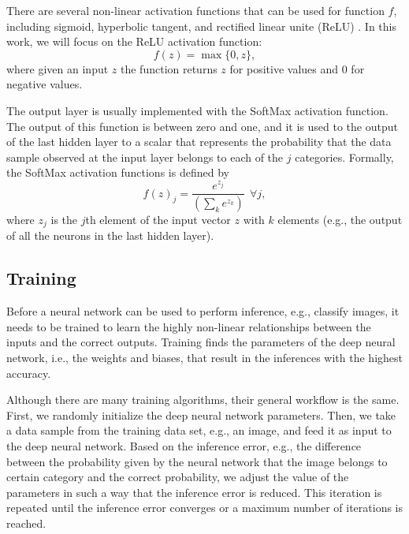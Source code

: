 \documentclass[conference]{IEEEtran}
\begin{document}
There are several non-linear activation functions that can be used for function $f$, including sigmoid,
hyperbolic tangent, and rectified linear unite (ReLU) \cite{Goodfellow-et-al-2016}. In this
work, we will focus on the ReLU activation function:
$$f(z) = \max\{0, z\},$$
where given an input $z$ the function returns $z$ for positive values and $0$ for negative values.

The output layer is usually implemented with the SoftMax activation function. The output of this function is between zero and
one, and it is used to the output of the last hidden layer to a scalar that represents the probability that the data sample observed at
the input layer belongs to each of the $j$ categories. Formally, the SoftMax activation functions is defined by
$$f(z)_j = \frac{e^{z_j}} {(\sum_ke^{z_k})} \ \  \forall j,$$
where $z_j$ is the $j$th element of the input vector $z$ with $k$ elements (e.g., the output of all the neurons in the last hidden
layer).

\subsection{Training}
Before a neural network can be used to perform inference, e.g., classify images, it needs to be trained to learn the highly non-linear relationships between the inputs and the correct outputs. Training finds the
parameters of the deep neural network, i.e., the weights and biases, that result in the inferences with the highest accuracy.  

Although there are many training algorithms, their general workflow is the same. 
First, we randomly initialize the deep neural network parameters.
Then, we take a data sample from the training data set, e.g., an image, and feed it as input to the deep neural network. Based on the
inference error, e.g., the difference between the probability given by the neural network that the image belongs to certain category
and the correct probability, we adjust the value of the parameters in such a way that the inference error is reduced. This iteration is
repeated until the inference error converges or a maximum number of iterations is reached. 
\end{document}
